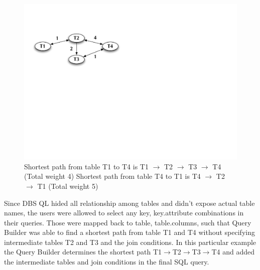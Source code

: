 \documentclass[a4paper]{jpconf}
\begin{document}
\begin{figure}[htb]
\centering
\includegraphics[width=150mm]{DBSSql_shortestpath.pdf}
\caption{
Shortest path from table T1 to T4 is 
T1 $\rightarrow$ T2 $\rightarrow$ T3 $\rightarrow$ T4  (Total weight 4) 
Shortest path from table T4 to T1 is 
T4 $\rightarrow$ T2 $\rightarrow$ T1 (Total weight 5) 
}
\label{ShortestPath}
\end{figure}

Since DBS QL hided all relationship among tables and didn't
expose actual table names, the users were allowed to
select any key, key.attribute combinations in their queries.
Those were mapped back to table, table.columns, such that
Query Builder was able to find a shortest path
from table T1 and T4 without specifying intermediate 
tables T2 and T3 and the join conditions. In this
particular example the Query Builder determines
the shortest path 
T1$\rightarrow$T2$\rightarrow$T3$\rightarrow$T4 
and added the intermediate tables 
and join conditions in the final SQL query. 
\end{document}
